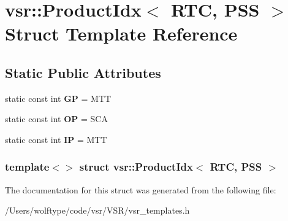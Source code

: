 \hypertarget{structvsr_1_1_product_idx_3_01_r_t_c_00_01_p_s_s_01_4}{\section{vsr\-:\-:Product\-Idx$<$ R\-T\-C, P\-S\-S $>$ Struct Template Reference}
\label{structvsr_1_1_product_idx_3_01_r_t_c_00_01_p_s_s_01_4}
}
\subsection*{Static Public Attributes}
\begin{DoxyCompactItemize}
\item 
\hypertarget{structvsr_1_1_product_idx_3_01_r_t_c_00_01_p_s_s_01_4_aa34791c7114432ddf0f3fb85899779a8}{static const int {\bfseries G\-P} = M\-T\-T}\label{structvsr_1_1_product_idx_3_01_r_t_c_00_01_p_s_s_01_4_aa34791c7114432ddf0f3fb85899779a8}

\item 
\hypertarget{structvsr_1_1_product_idx_3_01_r_t_c_00_01_p_s_s_01_4_a1c4124f28bee5eb4260b3550fb919e99}{static const int {\bfseries O\-P} = S\-C\-A}\label{structvsr_1_1_product_idx_3_01_r_t_c_00_01_p_s_s_01_4_a1c4124f28bee5eb4260b3550fb919e99}

\item 
\hypertarget{structvsr_1_1_product_idx_3_01_r_t_c_00_01_p_s_s_01_4_aff04e4fb9d580f56d147e7715dcaa5ac}{static const int {\bfseries I\-P} = M\-T\-T}\label{structvsr_1_1_product_idx_3_01_r_t_c_00_01_p_s_s_01_4_aff04e4fb9d580f56d147e7715dcaa5ac}

\end{DoxyCompactItemize}
\subsubsection*{template$<$$>$ struct vsr\-::\-Product\-Idx$<$ R\-T\-C, P\-S\-S $>$}



The documentation for this struct was generated from the following file\-:\begin{DoxyCompactItemize}
\item 
/\-Users/wolftype/code/vsr/\-V\-S\-R/vsr\-\_\-templates.\-h\end{DoxyCompactItemize}
